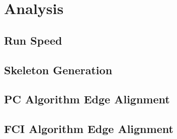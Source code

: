 \documentclass{article}
\begin{document}
\section{Analysis}
\subsection{Run Speed}
\subsection{Skeleton Generation}
\subsection{PC Algorithm Edge Alignment}
\subsection{FCI Algorithm Edge Alignment}
\end{document}
